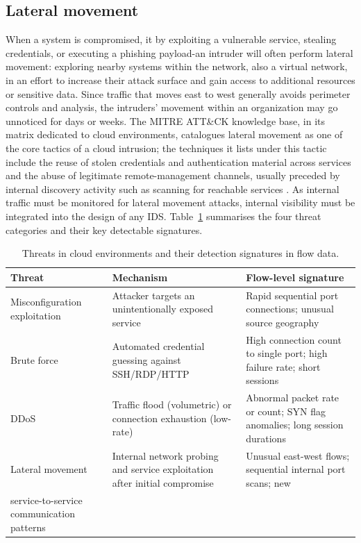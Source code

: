 \subsection{Lateral movement}

When a system is compromised, it by exploiting a vulnerable service, stealing credentials, or executing a phishing payload-an intruder will often perform lateral movement: exploring nearby systems within the network, also a virtual network, in an effort to increase their attack surface and gain access to additional resources or sensitive data. Since traffic that moves east to west generally avoids perimeter controls and analysis, the intruders' movement within an organization may go unnoticed for days or weeks. The MITRE ATT\&CK knowledge base, in its matrix dedicated to cloud environments, catalogues lateral movement as one of the core tactics of a cloud intrusion; the techniques it lists under this tactic include the reuse of stolen credentials and authentication material across services and the abuse of legitimate remote-management channels, usually preceded by internal discovery activity such as scanning for reachable services \cite{mitre_attack_cloud}. As internal traffic must be monitored for lateral movement attacks, internal visibility must be integrated into the design of any IDS.
Table~\ref{tab:cloud_threats} summarises the four threat categories and their key
detectable signatures.

\begin{table}[H]
  \centering
  \caption{Threats in cloud environments and their detection
           signatures in flow data.}
  \label{tab:cloud_threats}
  \renewcommand{\arraystretch}{1.4}
  \begin{tabularx}{\textwidth}{lXX}
    \toprule
    \textbf{Threat} & \textbf{Mechanism} & \textbf{Flow-level signature} \\
    \midrule
    Misconfiguration exploitation
      & Attacker targets an unintentionally exposed service
      & Rapid sequential port connections; unusual source geography \\
    \midrule
    Brute force
      & Automated credential guessing against SSH/RDP/HTTP
      & High connection count to single port; high failure rate; short sessions \\
    \midrule
    DDoS
      & Traffic flood (volumetric) or connection exhaustion (low-rate)
      & Abnormal packet rate or count; SYN flag anomalies; long session durations \\
    \midrule
    Lateral movement
      & Internal network probing and service exploitation after initial compromise
      & Unusual east-west flows; sequential internal port scans; new \\
        service-to-service communication patterns \\
    \bottomrule
  \end{tabularx}
\end{table}

